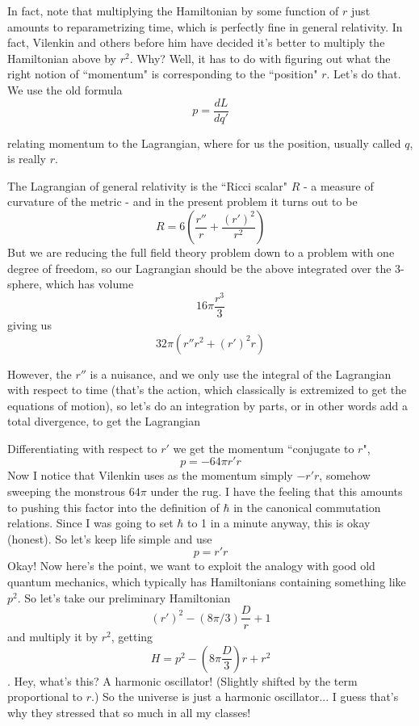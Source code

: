 In fact, note that multiplying the Hamiltonian by some function of $r$ just amounts to reparametrizing time, which is perfectly fine in general relativity. In fact, Vilenkin and others before him have decided it's better to multiply the Hamiltonian above by $r^2$. Why? Well, it has to do with figuring out what the right notion of ``momentum" is corresponding to the ``position" $r$. Let's do that. We use the old formula
\[p = \frac{dL}{dq'}\]

relating momentum to the Lagrangian, where for us the position, usually called $q$, is really $r$.

The Lagrangian of general relativity is the ``Ricci scalar" $R$ - a measure of curvature of the metric - and in the present problem it turns out to be
\[R = 6(\frac{r''}{r} + \frac{(r')^2}{r^2})\]
But we are reducing the full field theory problem down to a problem with one degree of freedom, so our Lagrangian should be the above integrated over the 3-sphere, which has volume \[16\pi\frac{r^3}{3}\] giving us \[32\pi (r''r^2 + (r')^2 r)\]

However, the $r''$ is a nuisance, and we only use the integral of the Lagrangian with respect to time (that's the action, which classically is extremized to get the equations of motion), so let's do an integration by parts, or in other words add a total divergence, to get the Lagrangian

Differentiating with respect to $r'$ we get the momentum ``conjugate to $r$", \[p = -64\pi r'r\]
Now I notice that Vilenkin uses as the momentum simply $-r'r$, somehow sweeping the monstrous $64\pi$ under the rug. I have the feeling that this amounts to pushing this factor into the definition of $\hbar$ in the canonical commutation relations. Since I was going to set $\hbar$ to 1 in a minute anyway, this is okay (honest). So let's keep life simple and use
\[p = r'r\]
Okay! Now here's the point, we want to exploit the analogy with good old quantum mechanics, which typically has Hamiltonians containing something like $p^2$. So let's take our preliminary Hamiltonian
\[(r')^2 -(8\pi/3) \frac{D}{r} + 1\]
and multiply it by $r^2$, getting
\[H = p^2 - (8\pi \frac{D}{3})r + r^2\].
Hey, what's this? A harmonic oscillator! (Slightly shifted by the term proportional to $r$.) So the universe is just a harmonic oscillator... I guess that's why they stressed that so much in all my classes!

